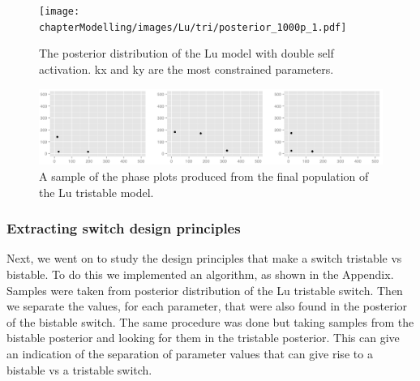 \begin{figure}[p]
\centering
\texttt{[image: chapterModelling/images/Lu/tri/posterior\_1000p\_1.pdf]}
\caption[The posterior distribution of the Lu model with double self activation]{The posterior distribution of the Lu model with double self activation. kx and ky are the most constrained parameters.}
\label{fig:lu_tristable}
\end{figure}


\begin{figure}[p]
\centering
\includegraphics[scale=0.4]{chapterModelling/images/Lu/tri/phase_plots.png}
\caption{A sample of the phase plots produced from the final population of the Lu tristable model.}
\label{fig:lu_tri_phase_pl}
\end{figure}


\subsubsection{Extracting switch design principles}
Next, we went on to study the design principles that make a switch tristable vs bistable. To do this we implemented an algorithm, as shown in the Appendix. Samples were taken from posterior distribution of the Lu tristable switch. Then we separate the values, for each parameter, that were also found in the posterior of the bistable switch. The same procedure was done but taking samples from the bistable posterior and looking for them in the tristable posterior. This can give an indication of the separation of parameter values that can give rise to a bistable vs a tristable switch. 

